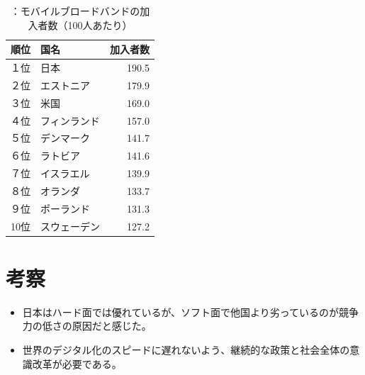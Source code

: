 \documentclass[a4paper,11pt,dvipdfmx]{ujarticle}
\begin{document}
\begin{table}[htbp]
    \centering
    \caption{：モバイルブロードバンドの加入者数（100人あたり）}
    \label{tbl:利用状況}

    \begin{tabular}{|l|l||r|}\hline
        順位 & 国名 & 加入者数 \\
        \hline
        １位 & 日本 & 190.5 \\
        \hline
        ２位 & エストニア & 179.9 \\
        \hline
        ３位 & 米国 & 169.0 \\
        \hline
        ４位 & フィンランド & 157.0 \\
        \hline
        ５位 & デンマーク & 141.7 \\
        \hline
        ６位 & ラトビア & 141.6 \\
        \hline 
        ７位 & イスラエル & 139.9 \\
        \hline
        ８位 & オランダ & 133.7 \\
        \hline
        ９位 & ポーランド & 131.3 \\
        \hline
        10位 & スウェーデン & 127.2 \\
        \hline
    \end{tabular}
\end{table}


\section{考察}
\begin{itemize}
    \item 日本はハード面では優れているが、ソフト面で他国より劣っているのが競争力の低さの原因だと感じた。
    \item 世界のデジタル化のスピードに遅れないよう、継続的な政策と社会全体の意識改革が必要である。
\end{itemize}

%


\end{document}
